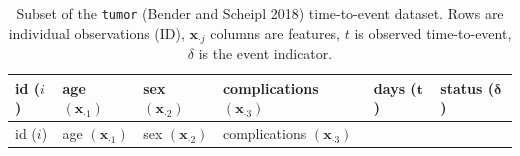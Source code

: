 \documentclass[
  letterpaper,
  krantz2]{style/krantz}
\begin{document}
\begin{longtable}[]{@{}
  >{\raggedleft\arraybackslash}p{}
  >{\raggedleft\arraybackslash}p{}
  >{\raggedright\arraybackslash}p{}
  >{\raggedright\arraybackslash}p{}
  >{\raggedleft\arraybackslash}p{}
  >{\raggedleft\arraybackslash}p{}@{}}
\caption{Subset of the \texttt{tumor} (Bender and Scheipl 2018)
time-to-event dataset. Rows are individual observations (ID),
\(\mathbf{x}_{\cdot j}\) columns are features, \(t\) is observed
time-to-event, \(\delta\) is the event
indicator.}\label{tbl-surv-data-tumor}\tabularnewline
\toprule\noalign{}
\begin{minipage}[b]{\linewidth}\raggedleft
id (\(i\))
\end{minipage} & \begin{minipage}[b]{\linewidth}\raggedleft
age \((\mathbf{x}_{\cdot 1})\)
\end{minipage} & \begin{minipage}[b]{\linewidth}\raggedright
sex \((\mathbf{x}_{\cdot 2})\)
\end{minipage} & \begin{minipage}[b]{\linewidth}\raggedright
complications \((\mathbf{x}_{\cdot 3})\)
\end{minipage} & \begin{minipage}[b]{\linewidth}\raggedleft
days (\(\mathbf{t}\))
\end{minipage} & \begin{minipage}[b]{\linewidth}\raggedleft
status (\(\boldsymbol{\delta}\))
\end{minipage} \\
\midrule\noalign{}
\endfirsthead
\toprule\noalign{}
\begin{minipage}[b]{\linewidth}\raggedleft
id (\(i\))
\end{minipage} & \begin{minipage}[b]{\linewidth}\raggedleft
age \((\mathbf{x}_{\cdot 1})\)
\end{minipage} & \begin{minipage}[b]{\linewidth}\raggedright
sex \((\mathbf{x}_{\cdot 2})\)
\end{minipage} & \begin{minipage}[b]{\linewidth}\raggedright
complications \((\mathbf{x}_{\cdot 3})\)
\end{minipage} & \begin{minipage}[b]{\linewidth}\raggedleft

\end{minipage}
\end{longtable}
\end{document}
